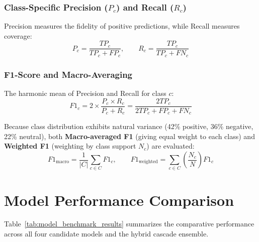 \subsubsection{Class-Specific Precision ($P_c$) and Recall ($R_c$)}
Precision measures the fidelity of positive predictions, while Recall measures coverage:
\begin{equation}
    P_c = \frac{TP_c}{TP_c + FP_c}, \qquad R_c = \frac{TP_c}{TP_c + FN_c}
    \label{eq:prec_rec}
\end{equation}

\subsubsection{F1-Score and Macro-Averaging}
The harmonic mean of Precision and Recall for class $c$:
\begin{equation}
    F1_c = 2 \times \frac{P_c \times R_c}{P_c + R_c} = \frac{2 TP_c}{2 TP_c + FP_c + FN_c}
    \label{eq:f1_class}
\end{equation}

Because class distribution exhibits natural variance (42\% positive, 36\% negative, 22\% neutral), both \textbf{Macro-averaged F1} (giving equal weight to each class) and \textbf{Weighted F1} (weighting by class support $N_c$) are evaluated:
\begin{equation}
    F1_{\text{macro}} = \frac{1}{|C|} \sum_{c \in C} F1_c, \qquad F1_{\text{weighted}} = \sum_{c \in C} \left( \frac{N_c}{N} \right) F1_c
    \label{eq:f1_macro_weighted}
\end{equation}

\section{Model Performance Comparison}
\label{sec:model_comparison}

Table~\ref{tab:model_benchmark_results} summarizes the comparative performance across all four candidate models and the hybrid cascade ensemble.

